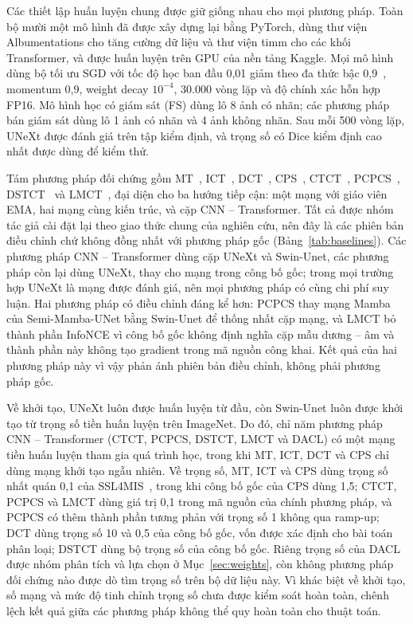 \documentclass{IEEEtran}
\begin{document}
Các thiết lập huấn luyện chung được giữ giống nhau cho mọi phương pháp. Toàn bộ mười một mô hình đã được xây dựng lại bằng PyTorch, dùng thư viện Albumentations cho tăng cường dữ liệu và thư viện timm cho các khối Transformer, và được huấn luyện trên GPU của nền tảng Kaggle. Mọi mô hình dùng bộ tối ưu SGD với tốc độ học ban đầu 0,01 giảm theo đa thức bậc 0,9~\cite{poly}, momentum 0,9, weight decay $10^{-4}$, 30.000 vòng lặp và độ chính xác hỗn hợp FP16. Mô hình học có giám sát (FS) dùng lô 8 ảnh có nhãn; các phương pháp bán giám sát dùng lô 1 ảnh có nhãn và 4 ảnh không nhãn. Sau mỗi 500 vòng lặp, UNeXt được đánh giá trên tập kiểm định, và trọng số có Dice kiểm định cao nhất được dùng để kiểm thử.

Tám phương pháp đối chứng gồm MT~\cite{mt}, ICT~\cite{ict}, DCT~\cite{dct}, CPS~\cite{cps}, CTCT~\cite{ctct}, PCPCS~\cite{pcpcs}, DSTCT~\cite{dstct} và LMCT~\cite{lmct}, đại diện cho ba hướng tiếp cận: một mạng với giáo viên EMA, hai mạng cùng kiến trúc, và cặp CNN -- Transformer. Tất cả được nhóm tác giả cài đặt lại theo giao thức chung của nghiên cứu, nên đây là các phiên bản điều chỉnh chứ không đồng nhất với phương pháp gốc (Bảng~\ref{tab:baselines}). Các phương pháp CNN -- Transformer dùng cặp UNeXt và Swin-Unet, các phương pháp còn lại dùng UNeXt, thay cho mạng trong công bố gốc; trong mọi trường hợp UNeXt là mạng được đánh giá, nên mọi phương pháp có cùng chi phí suy luận. Hai phương pháp có điều chỉnh đáng kể hơn: PCPCS thay mạng Mamba của Semi-Mamba-UNet bằng Swin-Unet để thống nhất cặp mạng, và LMCT bỏ thành phần InfoNCE vì công bố gốc không định nghĩa cặp mẫu dương -- âm và thành phần này không tạo gradient trong mã nguồn công khai. Kết quả của hai phương pháp này vì vậy phản ánh phiên bản điều chỉnh, không phải phương pháp gốc.



Về khởi tạo, UNeXt luôn được huấn luyện từ đầu, còn Swin-Unet luôn được khởi tạo từ trọng số tiền huấn luyện trên ImageNet. Do đó, chỉ năm phương pháp CNN -- Transformer (CTCT, PCPCS, DSTCT, LMCT và DACL) có một mạng tiền huấn luyện tham gia quá trình học, trong khi MT, ICT, DCT và CPS chỉ dùng mạng khởi tạo ngẫu nhiên. Về trọng số, MT, ICT và CPS dùng trọng số nhất quán 0,1 của SSL4MIS~\cite{ssl4mis}, trong khi công bố gốc của CPS dùng 1,5; CTCT, PCPCS và LMCT dùng giá trị 0,1 trong mã nguồn của chính phương pháp, và PCPCS có thêm thành phần tương phản với trọng số 1 không qua ramp-up; DCT dùng trọng số 10 và 0,5 của công bố gốc, vốn được xác định cho bài toán phân loại; DSTCT dùng bộ trọng số của công bố gốc. Riêng trọng số của DACL được nhóm phân tích và lựa chọn ở Mục~\ref{sec:weights}, còn không phương pháp đối chứng nào được dò tìm trọng số trên bộ dữ liệu này. Vì khác biệt về khởi tạo, số mạng và mức độ tinh chỉnh trọng số chưa được kiểm soát hoàn toàn, chênh lệch kết quả giữa các phương pháp không thể quy hoàn toàn cho thuật toán.
\end{document}
